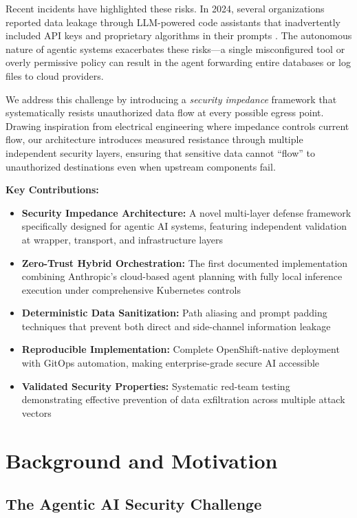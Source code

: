 \documentclass[11pt]{article}
\begin{document}
Recent incidents have highlighted these risks. In 2024, several organizations reported data leakage through LLM-powered code assistants that inadvertently included API keys and proprietary algorithms in their prompts \cite{securityweek2024}. The autonomous nature of agentic systems exacerbates these risks—a single misconfigured tool or overly permissive policy can result in the agent forwarding entire databases or log files to cloud providers.

We address this challenge by introducing a \emph{security impedance} framework that systematically resists unauthorized data flow at every possible egress point. Drawing inspiration from electrical engineering where impedance controls current flow, our architecture introduces measured resistance through multiple independent security layers, ensuring that sensitive data cannot ``flow'' to unauthorized destinations even when upstream components fail.

\textbf{Key Contributions:}
\begin{itemize}
\item \textbf{Security Impedance Architecture:} A novel multi-layer defense framework specifically designed for agentic AI systems, featuring independent validation at wrapper, transport, and infrastructure layers
\item \textbf{Zero-Trust Hybrid Orchestration:} The first documented implementation combining Anthropic's cloud-based agent planning with fully local inference execution under comprehensive Kubernetes controls
\item \textbf{Deterministic Data Sanitization:} Path aliasing and prompt padding techniques that prevent both direct and side-channel information leakage
\item \textbf{Reproducible Implementation:} Complete OpenShift-native deployment with GitOps automation, making enterprise-grade secure AI accessible
\item \textbf{Validated Security Properties:} Systematic red-team testing demonstrating effective prevention of data exfiltration across multiple attack vectors
\end{itemize}

\section{Background and Motivation}

\subsection{The Agentic AI Security Challenge}
\end{document}
